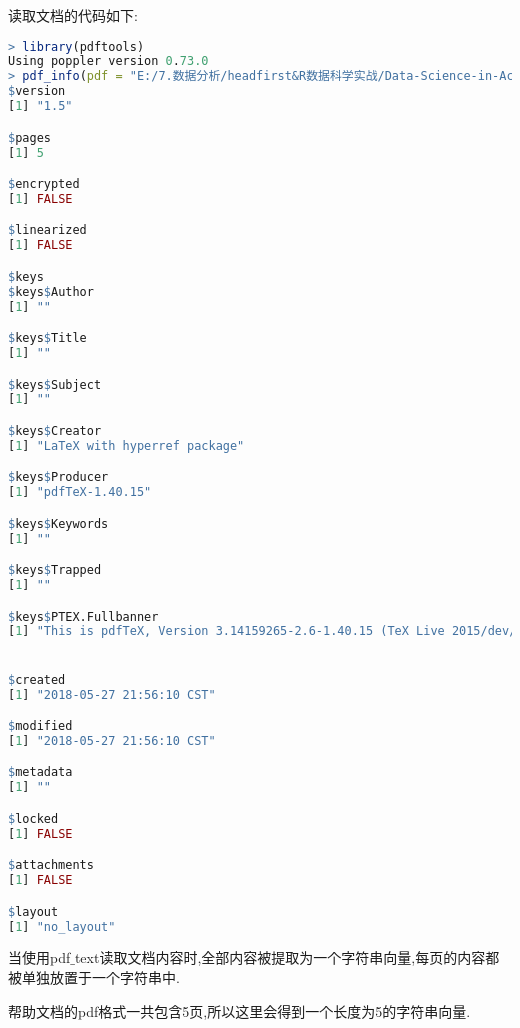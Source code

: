 \documentclass[11pt,a4paper,oneside]{book}
\begin{document}
读取文档的代码如下:
\begin{lstlisting}[language=r]
> library(pdftools)
Using poppler version 0.73.0
> pdf_info(pdf = "E:/7.数据分析/headfirst&R数据科学实战/Data-Science-in-Action-R-Tools-and-Case-Studies-master/chapter1/RawData/pdftools.pdf")
$version
[1] "1.5"

$pages
[1] 5

$encrypted
[1] FALSE

$linearized
[1] FALSE

$keys
$keys$Author
[1] ""

$keys$Title
[1] ""

$keys$Subject
[1] ""

$keys$Creator
[1] "LaTeX with hyperref package"

$keys$Producer
[1] "pdfTeX-1.40.15"

$keys$Keywords
[1] ""

$keys$Trapped
[1] ""

$keys$PTEX.Fullbanner
[1] "This is pdfTeX, Version 3.14159265-2.6-1.40.15 (TeX Live 2015/dev/Debian) kpathsea version 6.2.1dev"


$created
[1] "2018-05-27 21:56:10 CST"

$modified
[1] "2018-05-27 21:56:10 CST"

$metadata
[1] ""

$locked
[1] FALSE

$attachments
[1] FALSE

$layout
[1] "no_layout"
\end{lstlisting}

当使用pdf$ \_ $text读取文档内容时,全部内容被提取为一个字符串向量,每页的内容都被单独放置于一个字符串中.

帮助文档的pdf格式一共包含5页,所以这里会得到一个长度为5的字符串向量.
\end{document}
